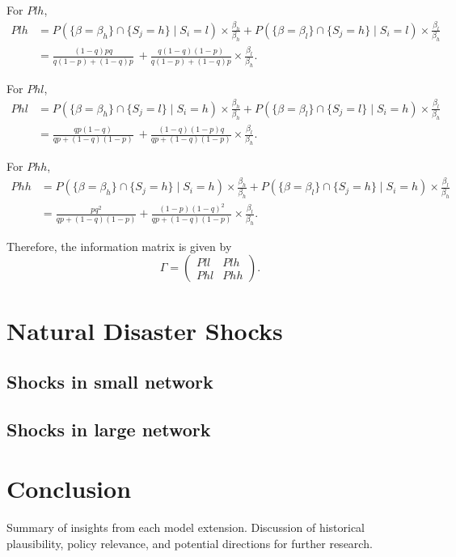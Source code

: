 \documentclass[12pt]{article}
\begin{document}
For \( Plh \),
\begin{align*}
Plh &= P\left( \{\beta = \beta_h\} \cap \{S_j = h\} \mid S_i = l \right) \times \frac{\beta_h}{\beta_h}
+ P\left( \{\beta = \beta_l\} \cap \{S_j = h\} \mid S_i = l \right) \times \frac{\beta_l}{\beta_h}\\
&= \frac{(1-q)pq}{q(1-p) + (1-q)p}\
+ \frac{q(1-q)(1-p)}{q(1-p) + (1-q)p} \times \frac{\beta_l}{\beta_h}.
\end{align*}

For \( Phl \),
\begin{align*}
Phl &= P\left( \{\beta = \beta_h\} \cap \{S_j = l\} \mid S_i = h \right) \times \frac{\beta_h}{\beta_h}
+ P\left( \{\beta = \beta_l\} \cap \{S_j = l\} \mid S_i = h \right) \times \frac{\beta_l}{\beta_h} \\
&= \frac{qp(1-q)}{qp + (1-q)(1-p)} \
+ \frac{(1-q)(1-p)q}{qp + (1-q)(1-p)} \times \frac{\beta_l}{\beta_h}.
\end{align*}

For \( Phh \),
\begin{align*}
Phh &= P\left( \{\beta = \beta_h\} \cap \{S_j = h\} \mid S_i = h \right) \times \frac{\beta_h}{\beta_h}
+ P\left( \{\beta = \beta_l\} \cap \{S_j = h\} \mid S_i = h \right) \times \frac{\beta_l}{\beta_h} \\
&= \frac{pq^2}{qp + (1-q)(1-p)}
+ \frac{(1-p)(1-q)^2}{qp + (1-q)(1-p)} \times \frac{\beta_l}{\beta_h}.
\end{align*}

Therefore, the information matrix is given by
\[
\Gamma = 
\begin{pmatrix}
Pll & Plh \\
Phl & Phh
\end{pmatrix}.
\]


\section{Natural Disaster Shocks}
\subsection{Shocks in small network}
\subsection{Shocks in large network}
\section{Conclusion}
Summary of insights from each model extension. Discussion of historical plausibility, policy relevance, and potential directions for further research.

  
\end{document}
